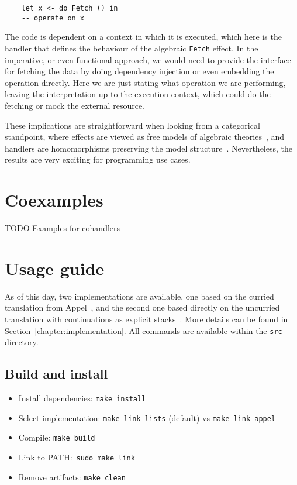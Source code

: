 \documentclass[declaration,shortabstract]{iithesis}
\theoremstyle{definition} \newtheorem{definition}{Definition}[chapter]
\theoremstyle{remark} \newtheorem{remark}[definition]{Observation}
\theoremstyle{plain} \newtheorem{theorem}[definition]{Theorem}
\theoremstyle{plain} \newtheorem{lemma}[definition]{Lemma}
\begin{document}
\begin{verbatim}
    let x <- do Fetch () in
    -- operate on x
\end{verbatim}

    The code is dependent on a context in which it is executed, which here is
    the handler that defines the behaviour of the algebraic \verb!Fetch! effect.
    In the imperative, or even functional approach, we would need to provide
    the interface for fetching the data by doing dependency injection or even
    embedding the operation directly. Here we are just stating what operation
    we are performing, leaving the interpretation up to the execution context,
    which could do the fetching or mock the external resource.

    These implications are straightforward when looking from a categorical standpoint,
    where effects are viewed as free models of algebraic theories~\cite{adequacy},
    and handlers are homomorphisms preserving the model structure~\cite{handlers}.
    Nevertheless, the results are very exciting for programming use cases.

\section{Coexamples}

    TODO Examples for cohandlers

\section{Usage guide}

    As of this day, two implementations are available, one based on the curried
    translation from Appel~\cite{appel-continuations}, and the second one based
    directly on the uncurried translation with continuations as explicit
    stacks~\cite{handlers-cps-journal}. More details can be found in
    Section~\ref{chapter:implementation}. All commands are available within the
    \verb!src! directory.

    \subsection{Build and install}

    \begin{itemize}
        \item Install dependencies: \verb!make install!
        \item Select implementation: \verb!make link-lists! (default) vs \verb!make link-appel!
        \item Compile: \verb!make build!
        \item Link to PATH:~\verb!sudo make link!
        \item Remove artifacts: \verb!make clean!
    \end{itemize}
\end{document}
